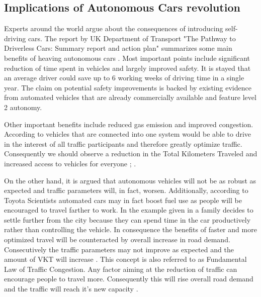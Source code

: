 \documentclass[11pt,english]{article}
\begin{document}






\subsection{Implications of Autonomous Cars revolution}



\par
Experts around the world argue about the consequences of introducing self-driving cars. The report by UK Department of Transport "The Pathway to Driverless Cars: Summary report and action plan" summarizes some main benefits of heaving autonomous cars \citep{pathwaytodriverless}. Most important points include significant reduction of time spent in vehicles and largely improved safety. It is stayed that an average driver could save up to 6 working weeks of driving time in a single year. The claim on potential safety improvements is backed by existing evidence from automated vehicles that are already commercially available and feature level 2 autonomy. 
\par
Other important benefits include reduced gas emission and improved congestion. According to \citet{pathwaytodriverless} vehicles that are connected into one system would be able to drive in the interest of all traffic participants and therefore greatly optimize traffic. Consequently we should observe a reduction in the Total Kilometers Traveled and increased access to vehicles for everyone \citep{pathwaytodriverless} ; \citep{drivewave}.
\par

On the other hand, it is argued that autonomous vehicles will not be as robust as expected and traffic parameters will, in fact, worsen\citep{sivak2015road}. Additionally, according to Toyota Scientists \citep{toyota1} automated cars may in fact boost fuel use as people will be encouraged to travel farther to work. In the example given in \citet{litman2014autonomous} a family decides to settle further from the city because they can spend time in the car productively rather than controlling the vehicle. In consequence the benefits of faster and more optimized travel will be counteracted by overall increase in road demand. Consecutively the traffic parameters may not improve as expected and the amount of VKT will increase \citep{litman2014autonomous}. This concept is also referred to as Fundamental Law of Traffic Congestion. Any factor aiming at the reduction of traffic can encourage people to travel more. Consequently this will rise overall road demand and the traffic will reach it's new capacity \citep{duranton2011fundamental}.
\end{document}
